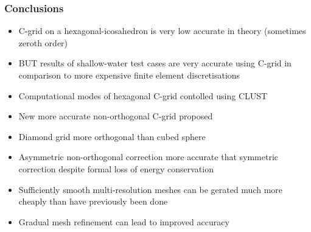 \begin{frame}
\frametitle{Conclusions}

\begin{itemize}[<+->]

\item C-grid on a hexagonal-icosahedron is very low accurate in theory (sometimes zeroth order)

\item BUT results of shallow-water test cases are very accurate using C-grid in comparison to more expensive finite element discretisations

\item Computational modes of hexagonal C-grid contolled using CLUST

\item New more accurate non-orthogonal C-grid proposed

\item Diamond grid more orthogonal than cubed sphere

\item Asymmetric non-orthogonal correction more accurate that symmetric correction despite formal loss of energy conservation

\item Sufficiently smooth multi-resolution meshes can be gerated much more cheaply than have previously been done

\item Gradual mesh refinement can lead to improved accuracy

\end{itemize}

\end{frame}

